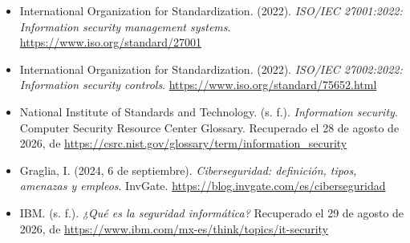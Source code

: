 \documentclass[12pt]{article}
\begin{document}
	\begin{itemize}[
		leftmargin=1.27cm,
		label={},
		itemindent=-1.27cm,
		itemsep=6pt
		]
		
		\item International Organization for Standardization. (2022).
		\textit{ISO/IEC 27001:2022: Information security management systems}.
		\url{https://www.iso.org/standard/27001}
		
		\item International Organization for Standardization. (2022).
		\textit{ISO/IEC 27002:2022: Information security controls}.
		\url{https://www.iso.org/standard/75652.html}
		
		\item National Institute of Standards and Technology. (s. f.).
		\textit{Information security}. Computer Security Resource Center Glossary.
		Recuperado el 28 de agosto de 2026, de
		\url{https://csrc.nist.gov/glossary/term/information_security}
				
		\item Graglia, I. (2024, 6 de septiembre).
		\textit{Ciberseguridad: definición, tipos, amenazas y empleos}.
		InvGate.
		\url{https://blog.invgate.com/es/ciberseguridad}
		
		\item IBM. (s. f.).
		\textit{¿Qué es la seguridad informática?}
		Recuperado el 29 de agosto de 2026, de
		\url{https://www.ibm.com/mx-es/think/topics/it-security}
		
	\end{itemize}
	
\end{document}
